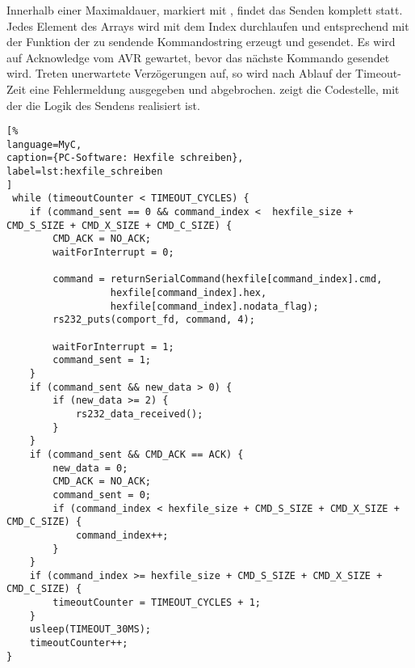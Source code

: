 Innerhalb einer Maximaldauer, markiert mit , findet das Senden komplett statt. Jedes Element des Arrays  wird mit dem Index  durchlaufen und entsprechend mit der Funktion  der zu sendende Kommandostring erzeugt und gesendet. Es wird auf Acknowledge vom AVR gewartet, bevor das nächste Kommando gesendet wird. Treten unerwartete Verzögerungen auf, so wird nach Ablauf der Timeout-Zeit eine Fehlermeldung ausgegeben und abgebrochen.  zeigt die Codestelle, mit der die Logik des Sendens realisiert ist. 
\begin{lstlisting}[%
language=MyC,
caption={PC-Software: Hexfile schreiben},
label=lst:hexfile_schreiben
]
 while (timeoutCounter < TIMEOUT_CYCLES) {
    if (command_sent == 0 && command_index <  hexfile_size + CMD_S_SIZE + CMD_X_SIZE + CMD_C_SIZE) {
        CMD_ACK = NO_ACK;
        waitForInterrupt = 0;

        command = returnSerialCommand(hexfile[command_index].cmd,
                  hexfile[command_index].hex,
                  hexfile[command_index].nodata_flag);
        rs232_puts(comport_fd, command, 4);

        waitForInterrupt = 1;
        command_sent = 1;
    }
    if (command_sent && new_data > 0) {
        if (new_data >= 2) {
            rs232_data_received();
        }
    }
    if (command_sent && CMD_ACK == ACK) {
        new_data = 0;
        CMD_ACK = NO_ACK;
        command_sent = 0;
        if (command_index < hexfile_size + CMD_S_SIZE + CMD_X_SIZE + CMD_C_SIZE) {
            command_index++;
        }
    }
    if (command_index >= hexfile_size + CMD_S_SIZE + CMD_X_SIZE + CMD_C_SIZE) {
        timeoutCounter = TIMEOUT_CYCLES + 1;
    }
    usleep(TIMEOUT_30MS);
    timeoutCounter++;
}
\end{lstlisting}%
\newpage
